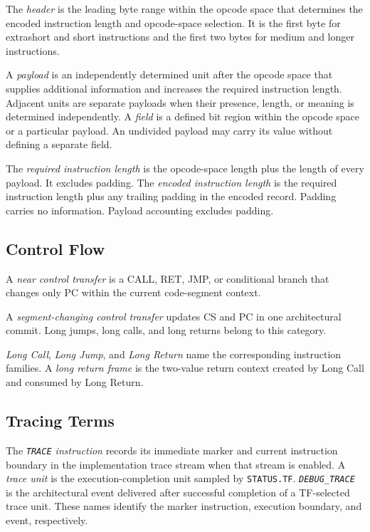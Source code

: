 The \emph{header} is the leading byte range within the opcode space that determines the encoded instruction length
and opcode-space selection. It is the first byte for extrashort and short instructions and the first two bytes for
medium and longer instructions.

A \emph{payload} is an independently determined unit after the opcode space that supplies additional information
and increases the required instruction length. Adjacent units are separate payloads when their presence, length, or
meaning is determined independently. A \emph{field} is a defined bit region within the opcode space or a particular
payload. An undivided payload may carry its value without defining a separate field.

The \emph{required instruction length} is the opcode-space length plus the length of every payload. It excludes
padding. The \emph{encoded instruction length} is the required instruction length plus any trailing padding in the
encoded record. Padding carries no information. Payload accounting excludes padding.

\subsection{Control Flow}\label{section:control-flow-terminology}

A \emph{near control transfer} is a CALL, RET, JMP, or conditional branch that changes only PC within the current
code-segment context.

A \emph{segment-changing control transfer} updates CS and PC in one architectural commit. Long jumps, long calls,
and long returns belong to this category.

\emph{Long Call}, \emph{Long Jump}, and \emph{Long Return} name the corresponding instruction families. A
\emph{long return frame} is the two-value return context created by Long Call and consumed by Long Return.

\subsection{Tracing Terms}\label{section:tracing-terminology}

The \emph{\texttt{TRACE} instruction} records its immediate marker and current instruction boundary in the
implementation trace stream when that stream is enabled. A \emph{trace unit} is the execution-completion unit
sampled by \texttt{STATUS.TF}. \emph{\texttt{DEBUG\_TRACE}} is the architectural event delivered after successful
completion of a TF-selected trace unit. These names identify the marker instruction, execution boundary, and event,
respectively.

